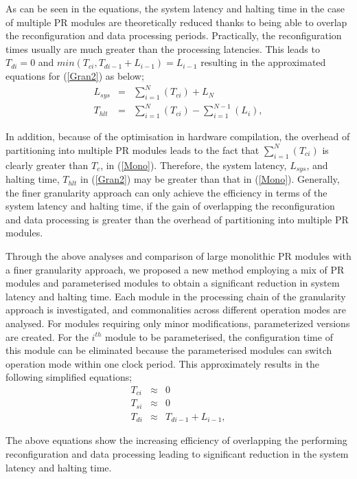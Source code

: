 As can be seen in the equations, the system latency and halting time in the case of multiple PR modules are theoretically reduced thanks to being able to overlap the reconfiguration and data processing periods. Practically, the reconfiguration times usually are much greater than the processing latencies. This leads to $T_{di} = 0$ and  $min(T_{ci}, T_{di-1}+L_{i-1}) = L_{i-1}$ resulting in the approximated equations for (\ref{Gran2}) as below;  
\begin{eqnarray}
\label{Gran3}
L_{sys} &= & \sum_{i = 1}^{N}(T_{ci}) + L_{N}    \nonumber \\
T_{hlt} &=  &\sum_{i = 1}^{N}(T_{ci})  -  \sum_{i = 1}^{N-1}  (L_{i}),
\end{eqnarray}

In addition, because of the optimisation in hardware compilation, the overhead of partitioning into multiple PR modules leads to the fact that $\sum_{i = 1}^{N}(T_{ci})$ is clearly greater than $T_{c}$, in (\ref{Mono}). Therefore, the system latency, $L_{sys}$, and halting time, $T_{hlt}$ in (\ref{Gran2}) may be greater than that in (\ref{Mono}).
Generally, the finer granularity approach can only achieve the efficiency in terms of the system latency and halting time, if the gain of overlapping the reconfiguration and data processing is greater than the overhead of partitioning into multiple PR modules.

Through the above analyses and comparison of large monolithic PR modules with a finer granularity approach, we proposed a new method employing a mix of PR modules and parameterised modules to obtain a significant reduction in system latency and halting time. Each module in the processing chain of the granularity approach is investigated, and commonalities across different operation modes are analysed. For modules requiring only minor modifications, parameterized versions are created.
For the $i^{th}$ module to be parameterised, the configuration time of this module can be eliminated because the parameterised modules can switch operation mode within one clock period. This approximately results in the following simplified equations;
\begin{eqnarray}
\label{Pro}
T_{ci} &\approx & 0   \nonumber \\
T_{si} &\approx & 0 \nonumber \\
T_{di} &\approx & T_{di-1} +  L_{i-1},
\end{eqnarray}

The above equations show the increasing efficiency of overlapping the performing reconfiguration and data processing leading to significant reduction in the system latency and halting time.

